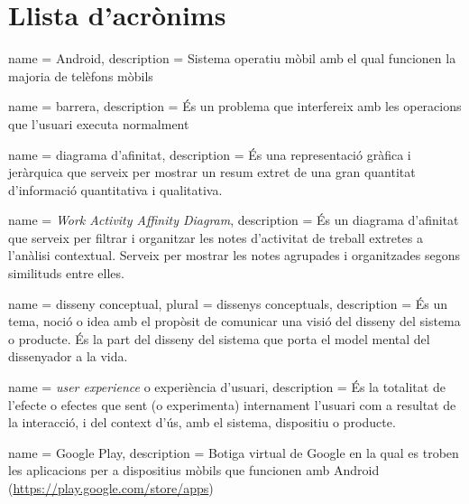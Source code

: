 \chapter*{Llista d'acrònims}
\label{sec:glossary}


\begin{acronym}
\end{acronym}


{
name = Android, description = {Sistema operatiu mòbil amb el qual funcionen la majoria de telèfons mòbils \cite{Android_OS}}
}

{
name = barrera, description = {És un problema que interfereix amb les operacions que l'usuari executa normalment}
}

{
name = diagrama d'afinitat, description = {És una representació gràfica i jeràrquica que serveix per mostrar un resum extret de una gran quantitat d'informació quantitativa i qualitativa.}
}

{
name = \textit{Work Activity Affinity Diagram}, description = {És un diagrama d'afinitat que serveix per filtrar i organitzar les notes d'activitat de treball extretes a l'anàlisi contextual. Serveix per mostrar les notes agrupades i organitzades segons similituds entre elles.}
}

{
name = disseny conceptual, plural = dissenys conceptuals, description = {És un tema, noció o idea amb el propòsit de comunicar una visió del disseny del sistema o producte. És la part del disseny del sistema que porta el model mental del dissenyador a la vida.}
}

{
name = \textit{user experience} o experiència d'usuari, description = {És la totalitat de l'efecte o efectes que sent (o experimenta) internament l'usuari com a resultat de la interacció, i del context d'ús, amb el sistema, dispositiu o producte.}
}

{
name = Google Play, description = {Botiga virtual de Google en la qual es troben les aplicacions per a dispositius mòbils que funcionen amb \gls{Android} (\url{https://play.google.com/store/apps})}
}

